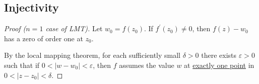 \documentclass[12pt]{article}
\begin{document}
\subsection{Injectivity}
\begin{proof}[Proof ($n=1$ case of LMT)]
    Let $w_{0}=f(z_{0})$. If $f^{\prime}(z_{0})\neq0$, then $f(z)-w_{0}$ has a zero of order one at $z_{0}$. 
    
    By the local mapping theorem, for each sufficiently small $\delta>0$ there exists $\varepsilon>0$ such that if $0<|w-w_{0}|<\varepsilon$, then $f$ assumes the value $w$ at \underline{exactly one point} in $0<|z-z_{0}|<\delta$.
\end{proof}
\end{document}
